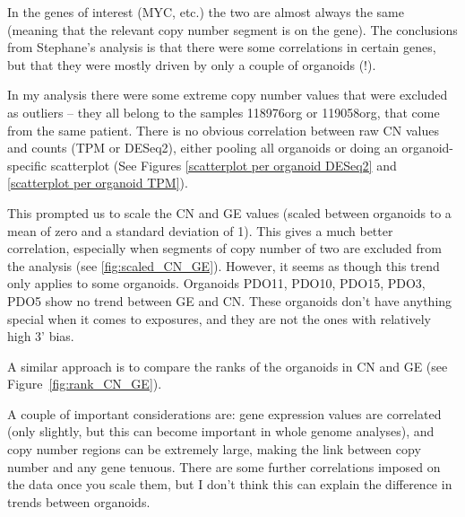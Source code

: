 \documentclass{article}
\begin{document}
In the genes of interest (MYC, etc.) the two are almost always the same (meaning that the relevant copy number segment is on the gene). The conclusions from Stephane's analysis is that there were some correlations in certain genes, but that they were mostly driven by only a couple of organoids (!). 

\medskip

In my analysis there were some extreme copy number values that were excluded as outliers -- they all belong to the samples 118976org or 119058org, that come from the same patient. There is no obvious correlation between raw CN values and counts (TPM or DESeq2), either pooling all organoids or doing an organoid-specific scatterplot (See Figures \href{https://github.com/lm687/Organoids_Compositional_Analysis/blob/master/RNASeq_and_CN/figures/joint_counts_CN_DESeq_all.pdf}{[scatterplot per organoid DESeq2]} and \href{https://github.com/lm687/Organoids_Compositional_Analysis/blob/master/RNASeq_and_CN/figures/joint_counts_CN_TPM_all.pdf}{[scatterplot per organoid TPM]}).

\medskip

This prompted us to scale the CN and GE values (scaled between organoids to a mean of zero and a standard deviation of 1). This gives a much better correlation, especially when segments of copy number of two are excluded from the analysis (see \ref{fig:scaled_CN_GE}). However, it seems as though this trend only applies to some organoids. Organoids PDO11, PDO10, PDO15, PDO3, PDO5 show no trend between GE and CN. These organoids don't have anything special when it comes to exposures, and they are not the ones with relatively high 3' bias.

\medskip

A similar approach is to compare the ranks of the organoids in CN and GE (see Figure~\ref{fig:rank_CN_GE}).

\medskip

A couple of important considerations are: gene expression values are correlated (only slightly, but this can become important in whole genome analyses), and copy number regions can be extremely large, making the link between copy number and any gene tenuous. There are some further correlations imposed on the data once you scale them, but I don't think this can explain the difference in trends between organoids.
\end{document}

